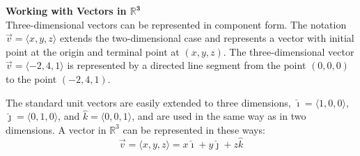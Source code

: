 \documentclass[a4paper]{article}
\let\bf\textbf
\let\la\langle
\let\ra\rangle
\newcommand{\ih}{\hat{\imath}}
\newcommand{\jh}{\hat{\jmath}}
\newcommand{\kh}{\hat{k}}
\begin{document}
\newpage
\noindent\bf{Working with Vectors in $\mathbb{R}^{\mathbf{3}}$}
\vspace{1mm}\\
Three-dimensional vectors can be represented in component form. The notation $\vec{v} = \la x, y, z \ra$ extends the two-dimensional case and represents a vector with initial point at the origin and terminal point at $(x, y, z)$. The three-dimensional vector $\vec{v} = \la -2, 4, 1 \ra$ is represented by a directed line segment from the point $(0,0,0)$ to the point $(-2,4,1)$.
\begin{center}
\end{center}
The standard unit vectors are easily extended to three dimensions, $\ih = \la 1,0,0 \ra$, $\jh = \la 0,1,0 \ra$, and $\kh = \la 0,0,1 \ra$, and are used in the same way as in two dimensions. A vector in $\mathbb{R}^3$ can be represented in these ways:
\begin{equation*}
    \vec{v} = \la x,y,z \ra = x\ih + y\jh + z\kh
\end{equation*}
\end{document}

